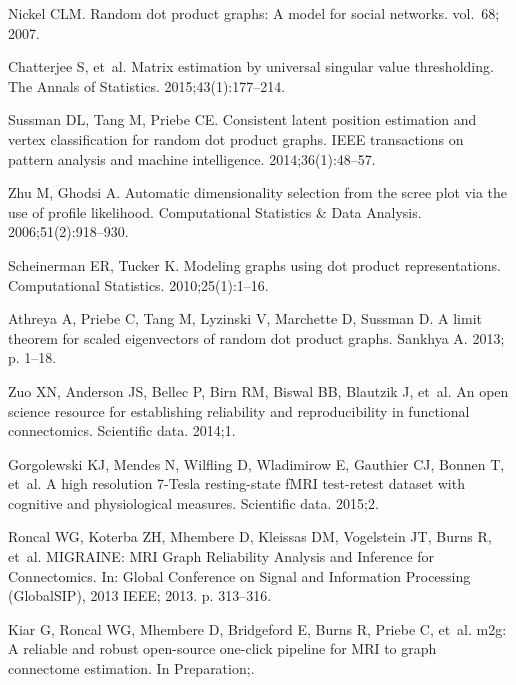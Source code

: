 \documentclass[10pt,letterpaper]{article}
\begin{document}
\begin{thebibliography}{10}
Nickel CLM.
\newblock Random dot product graphs: A model for social networks. vol.~68;
  2007.

Chatterjee S, et~al.
\newblock Matrix estimation by universal singular value thresholding.
\newblock The Annals of Statistics. 2015;43(1):177--214.

Sussman DL, Tang M, Priebe CE.
\newblock Consistent latent position estimation and vertex classification for
  random dot product graphs.
\newblock IEEE transactions on pattern analysis and machine intelligence.
  2014;36(1):48--57.

Zhu M, Ghodsi A.
\newblock Automatic dimensionality selection from the scree plot via the use of
  profile likelihood.
\newblock Computational Statistics \& Data Analysis. 2006;51(2):918--930.

Scheinerman ER, Tucker K.
\newblock Modeling graphs using dot product representations.
\newblock Computational Statistics. 2010;25(1):1--16.

Athreya A, Priebe C, Tang M, Lyzinski V, Marchette D, Sussman D.
\newblock A limit theorem for scaled eigenvectors of random dot product graphs.
\newblock Sankhya A. 2013; p. 1--18.

Zuo XN, Anderson JS, Bellec P, Birn RM, Biswal BB, Blautzik J, et~al.
\newblock An open science resource for establishing reliability and
  reproducibility in functional connectomics.
\newblock Scientific data. 2014;1.

Gorgolewski KJ, Mendes N, Wilfling D, Wladimirow E, Gauthier CJ, Bonnen T,
  et~al.
\newblock A high resolution 7-Tesla resting-state fMRI test-retest dataset with
  cognitive and physiological measures.
\newblock Scientific data. 2015;2.

Roncal WG, Koterba ZH, Mhembere D, Kleissas DM, Vogelstein JT, Burns R, et~al.
\newblock MIGRAINE: MRI Graph Reliability Analysis and Inference for
  Connectomics.
\newblock In: Global Conference on Signal and Information Processing
  (GlobalSIP), 2013 IEEE; 2013. p. 313--316.

Kiar G, Roncal WG, Mhembere D, Bridgeford E, Burns R, Priebe C, et~al.
\newblock m2g: A reliable and robust open-source one-click pipeline for MRI to
  graph connectome estimation. In Preparation;.


\end{thebibliography}
\end{document}
